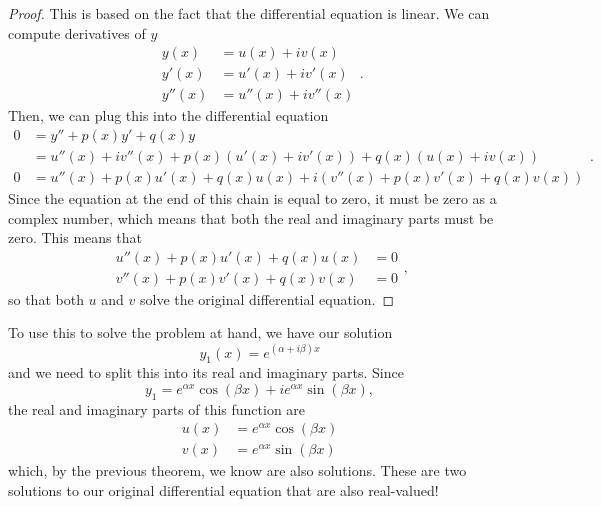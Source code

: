 \begin{proof}
This is based on the fact that the differential equation is linear. We can compute derivatives of $y$
\begin{equation*}
\begin{split}
y(x)&= u(x) + iv(x) \\
y'(x) &= u'(x) + iv'(x) \\
y''(x) &= u''(x) + iv''(x)
\end{split}.
\end{equation*}
Then, we can plug this into the differential equation
\begin{equation*}
\begin{split}
0 &= y'' + p(x)y' + q(x) y \\
&= u''(x) + iv''(x) + p(x)(u'(x) + iv'(x)) + q(x) (u(x) + iv(x)) \\
0&= u''(x) + p(x)u'(x) + q(x)u(x) + i(v''(x) + p(x)v'(x) + q(x)v(x)) 
\end{split}.
\end{equation*}
Since the equation at the end of this chain is equal to zero, it must be zero as a complex number, which means that both the real and imaginary parts must be zero. This means that
\begin{equation*}
\begin{split}
u''(x) + p(x)u'(x) + q(x)u(x) &= 0 \\
v''(x) + p(x)v'(x) + q(x)v(x) &= 0
\end{split},
\end{equation*}
so that both $u$ and $v$ solve the original differential equation.
\end{proof}

To use this to solve the problem at hand, we have our solution
\begin{equation*}
y_1(x) = e^{(\alpha + i\beta) x}
\end{equation*}
and we need to split this into its real and imaginary parts. Since
\begin{equation*}
y_1  = e^{\alpha x} \cos (\beta x) + i e^{\alpha x} \sin (\beta x),
\end{equation*}
the real and imaginary parts of this function are
\begin{equation*}
\begin{split}
u(x) &= e^{\alpha x} \cos (\beta x) \\
v(x) &= e^{\alpha x} \sin (\beta x)
\end{split}
\end{equation*}
which, by the previous theorem, we know are also solutions. These are two solutions to our original differential equation that are also real-valued!

